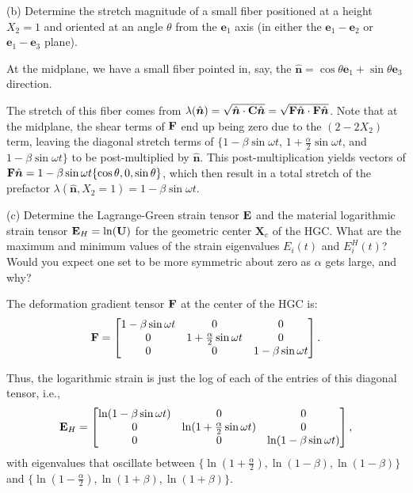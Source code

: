 (b) Determine the stretch magnitude of a small fiber positioned at a height $X_2 = 1$ and oriented at an angle $\theta$ from the $\bm{e}_1$ axis (in either the $\bm{e}_1- \bm{e}_2$ or $\bm{e}_1- \bm{e}_3$ plane).

At the midplane, we have a small fiber pointed in, say, the $\hat{\bm{n}} = \cos\theta \bm{e}_1 + \sin\theta\bm{e}_3$ direction. 

The stretch of this fiber comes from $\lambda(\hat{\bm{n}}) = \sqrt{\hat{\bm{n}}\cdot \mathbf{C} \hat{\bm{n}}} = \sqrt{\mathbf{F} \hat{\bm{n}} \cdot \mathbf{F} \hat{\bm{n}}}$. 
Note that at the midplane, the shear terms of $\mathbf{F}$ end up being zero due to the $(2-2X_2)$ term, leaving the diagonal stretch terms of $\{1-\beta \sin \omega t$, $1 + \frac{\alpha}{2} \sin \omega t$, and $1-\beta \sin \omega t\}$ to be post-multiplied by $\hat{\bm{n}}$. 
This post-multiplication yields vectors of $\mathbf{F} \hat{\bm{n}} = 1-\beta \sin \omega t\{\cos \theta, 0, \sin\theta\}$, which then result in a total stretch of the prefactor $\lambda(\hat{\bm{n}}, X_2=1) = 1-\beta \sin \omega t$.

(c) Determine the Lagrange-Green strain tensor $\mathbf{E}$ and the material logarithmic strain tensor $\mathbf{E}_H = \ln (\mathbf{U})$ for the geometric center $\bm{X}_c$ of the HGC. What are the maximum and minimum values of the strain eigenvalues $E_i(t)$ and $E_i^H(t)$? 
Would you expect one set to be more symmetric about zero as $\alpha$ gets large, and why?

The deformation gradient tensor $\mathbf{F}$ at the center of the HGC is:
\begin{equation*}
\mathbf{F} = \begin{bmatrix}
 1 - \beta \sin\omega t & 0 & 0 \\
 0 & 1 + \frac{\alpha}{2} \sin\omega t & 0 \\
 0 & 0 & 1- \beta \sin\omega t
 \end{bmatrix}. 
\end{equation*}

Thus, the logarithmic strain is just the log of each of the entries of this diagonal tensor, i.e.,
\begin{equation*}
\mathbf{E}_H = \begin{bmatrix}
 \ln(1 - \beta \sin\omega t) & 0 & 0 \\
 0 & \ln(1 + \frac{\alpha}{2} \sin\omega t) & 0 \\
 0 & 0 & \ln(1- \beta \sin\omega t)
 \end{bmatrix}, 
\end{equation*}
with eigenvalues that oscillate between $\{\ln(1 + \frac{\alpha}{2}), \ln(1 - \beta), \ln(1 - \beta)\}$ and $\{\ln(1 - \frac{\alpha}{2}), \ln(1 + \beta), \ln(1 + \beta)\}$. 

